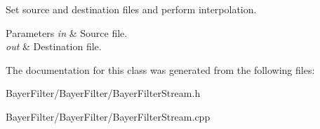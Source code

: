 Set source and destination files and perform interpolation. 
\begin{DoxyParams}{Parameters}
{\em in} & Source file. \\
\hline
{\em out} & Destination file. \\
\hline
\end{DoxyParams}


The documentation for this class was generated from the following files\-:\begin{DoxyCompactItemize}
\item 
Bayer\-Filter/\-Bayer\-Filter/Bayer\-Filter\-Stream.\-h\item 
Bayer\-Filter/\-Bayer\-Filter/Bayer\-Filter\-Stream.\-cpp\end{DoxyCompactItemize}
